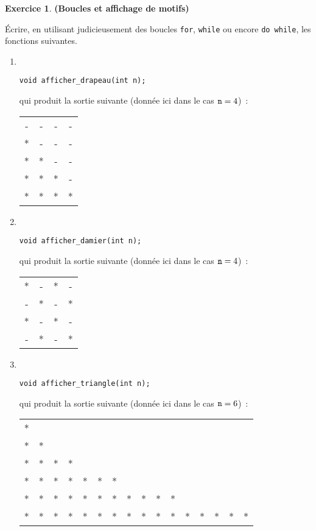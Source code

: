 \documentclass[12pt]{article}
\theoremstyle{definition}
\newtheorem{Exercice}{Exercice}
\begin{document}
\begin{Exercice} {\bf (Boucles et affichage de motifs)}\smallskip

Écrire, en utilisant judicieusement des boucles {\tt for},
{\tt while} ou encore {\tt do while}, les fonctions suivantes.
\begin{enumerate}
    \item ~
\begin{lstlisting}
void afficher_drapeau(int n);
\end{lstlisting}
    qui produit la sortie suivante
    (donnée ici dans le cas ${\tt n} = 4$)~:
    \begin{center}
        \begin{tabular}{cccc}
            - & - & - & - \\
            * & - & - & - \\
            * & * & - & - \\
            * & * & * & - \\
            * & * & * & *
        \end{tabular}
    \end{center}

    \item ~
\begin{lstlisting}
void afficher_damier(int n);
\end{lstlisting}
    qui produit la sortie suivante
    (donnée ici dans le cas ${\tt n} = 4$)~:
    \begin{center}
        \begin{tabular}{cccc}
            * & - & * & - \\
            - & * & - & * \\
            * & - & * & - \\
            - & * & - & *
        \end{tabular}
    \end{center}

    \item ~
\begin{lstlisting}
void afficher_triangle(int n);
\end{lstlisting}
    qui produit la sortie suivante
    (donnée ici dans le cas ${\tt n} = 6$)~:
    \begin{center}
        \begin{tabular}{cccccccccccccccc}
            * \\
            * & * \\
            * & * & * & * \\
            * & * & * & * & * & * & * \\
            * & * & * & * & * & * & * & * & * & * & * \\
            * & * & * & * & * & * & * & * & * & * & * & * & * & * & * & * \\
        \end{tabular}
    \end{center}
\end{enumerate}
\end{Exercice}
\bigskip
\end{document}
